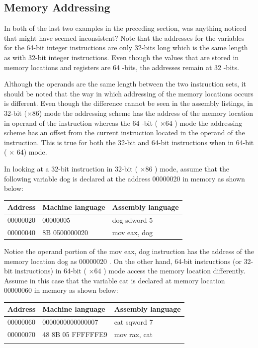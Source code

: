 \documentclass[10pt]{book}
\begin{document}
\subsection{Memory Addressing}
In both of the last two examples in the preceding section, was anything noticed that might have seemed inconsistent? Note that the addresses for the variables for the 64-bit integer instructions are only 32-bits long which is the same length as with 32-bit integer instructions. Even though the values that are stored in memory locations and registers are 64 -bits, the addresses remain at 32 -bits.


Although the operands are the same length between the two instruction sets, it should be noted that the way in which addressing of the memory locations occurs is different. Even though the difference cannot be seen in the assembly listings, in 32-bit (×86) mode the addressing scheme has the address of the memory location in operand of the instruction whereas the 64 -bit ( $\times 64$ ) mode the addressing scheme has an offset from the current instruction located in the operand of the instruction. This is true for both the 32-bit and 64-bit instructions when in 64-bit ( × 64) mode.

In looking at a 32-bit instruction in 32-bit ( $\times 86$ ) mode, assume that the following variable dog is declared at the address 00000020 in memory as shown below:

\begin{center}
\begin{tabular}{|l|l|l|}
\hline
Address & Machine language & Assembly language \\
\hline
00000020 & 00000005 & dog sdword 5 \\
\hline
00000040 & 8B 0500000020 & mov eax, dog \\
\hline
\end{tabular}
\end{center}

Notice the operand portion of the mov eax, dog instruction has the address of the memory location dog as 00000020 . On the other hand, 64-bit instructions (or 32-bit instructions) in 64-bit ( $\times 64$ ) mode access the memory location differently. Assume in this case that the variable cat is declared at memory location 00000060 in memory as shown below:

\begin{center}
\begin{tabular}{|l|l|l|}
\hline
Address & Machine language & Assembly language \\
\hline
00000060 & 0000000000000007 & cat sqword 7 \\
\hline
00000070 & 48 8B 05 FFFFFFE9 & mov rax, cat \\\index{.asm}
\hline
\end{tabular}
\end{center}
\end{document}
